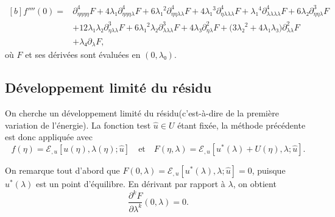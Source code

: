 \documentclass[12pt, final]{amsart}
\theoremstyle{definition}
\begin{document}
\begin{equation}
  \begin{aligned}[b]
    f''''(0) ={}
    & ∂_{ηηηη}^4F + 4 λ₁ ∂_{ηηηλ}^4 F + 6 λ₁^2 ∂_{ηηλλ}^4 F + 4 λ₁^3 ∂_{ηλλλ}^4 F + λ₁^4 ∂_{λλλλ}^4 F + 6 λ₂ ∂_{ηηλ}^3 F\\
    & + 12 λ₁ λ₂ ∂_{ηλλ}^3 F + 6 λ₁^2 λ₂ ∂_{λλλ}^3 F + 4 λ₃ ∂_{ηλ}^2 F + \bigl(3 λ₂^2 + 4 λ₁ λ₃\bigr) ∂_{λλ}^2 F \\
    & + λ₄ ∂_{λ} F,
  \end{aligned}
\end{equation}
où \(F\) et ses dérivées sont évaluées en \((0, λ₀)\).

\subsection{Développement limité du résidu}
\label{sec:20211112182000}

On cherche un développement limité du résidu(c'est-à-dire de la première
variation de l'énergie). La fonction test \(\hat{u} ∈ U\) étant fixée, la
méthode précédente est donc appliquée avec
\begin{equation}
  \label{eq:20220107054629}
  f(η) =ℰ_{, u} [u(η), λ(η); \hat{u}]
  \quad \text{et} \quad
  F(η, λ) = ℰ_{, u}[u^{\ast}(λ) + U(η), λ; \hat{u}].
\end{equation}

On remarque tout d'abord que
\(F(0, λ) =ℰ_{, u} [u^{\ast} (λ), λ; \hat{u}] = 0\), puisque \(u^{\ast}(λ)\) est
un point d'équilibre. En dérivant par rapport à \(λ\), on obtient
\begin{equation}
  \label{eq:20211112164204}
  \frac{∂^k F}{∂ λ^k}(0, λ) = 0.
\end{equation}
\end{document}
